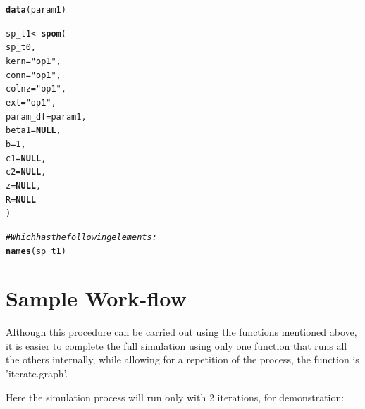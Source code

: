 \documentclass{article}\usepackage[]{graphicx}\usepackage[]{xcolor}
\makeatletter
\newcommand{\hlnum}[1]{\textcolor[rgb]{0.686,0.059,0.569}{#1}}%
\newcommand{\hlsng}[1]{\textcolor[rgb]{0.192,0.494,0.8}{#1}}%
\newcommand{\hlcom}[1]{\textcolor[rgb]{0.678,0.584,0.686}{\textit{#1}}}%
\newcommand{\hldef}[1]{\textcolor[rgb]{0.345,0.345,0.345}{#1}}%
\newcommand{\hlkwa}[1]{\textcolor[rgb]{0.161,0.373,0.58}{\textbf{#1}}}%
\newcommand{\hlkwb}[1]{\textcolor[rgb]{0.69,0.353,0.396}{#1}}%
\newcommand{\hlkwc}[1]{\textcolor[rgb]{0.333,0.667,0.333}{#1}}%
\newcommand{\hlkwd}[1]{\textcolor[rgb]{0.737,0.353,0.396}{\textbf{#1}}}%
\newenvironment{kframe}{%
 \def\at@end@of@kframe{}%
 \ifinner\ifhmode%
  \def\at@end@of@kframe{\end{minipage}}%
  \begin{minipage}{\columnwidth}%
 \fi\fi%
 \def\FrameCommand##1{\hskip\@totalleftmargin \hskip-\fboxsep
 \colorbox{shadecolor}{##1}\hskip-\fboxsep
     \hskip-\linewidth \hskip-\@totalleftmargin \hskip\columnwidth}%
 \MakeFramed {\advance\hsize-\width
   \@totalleftmargin\z@ \linewidth\hsize
   \@setminipage}}%
 {\par\unskip\endMakeFramed%
 \at@end@of@kframe}
\newenvironment{knitrout}{}{} %
\makeatother
\begin{document}
\begin{knitrout}
\color{fgcolor}\begin{kframe}
\begin{alltt}
\hlkwd{data}\hldef{(param1)}
\end{alltt}


{\ttfamily\noindent\color{warningcolor}{\#\# Warning in data(param1): data set 'param1' not found}}\begin{alltt}
\hldef{sp_t1} \hlkwb{<-} \hlkwd{spom}\hldef{(}
\hldef{sp_t0,}
\hlkwc{kern}\hldef{=}\hlsng{"op1"}\hldef{,}
\hlkwc{conn}\hldef{=}\hlsng{"op1"}\hldef{,}
\hlkwc{colnz}\hldef{=}\hlsng{"op1"}\hldef{,}
\hlkwc{ext}\hldef{=}\hlsng{"op1"}\hldef{,}
\hlkwc{param_df}\hldef{=param1,}
\hlkwc{beta1}\hldef{=}\hlkwa{NULL}\hldef{,}
\hlkwc{b}\hldef{=}\hlnum{1}\hldef{,}
\hlkwc{c1}\hldef{=}\hlkwa{NULL}\hldef{,}
\hlkwc{c2}\hldef{=}\hlkwa{NULL}\hldef{,}
\hlkwc{z}\hldef{=}\hlkwa{NULL}\hldef{,}
\hlkwc{R}\hldef{=}\hlkwa{NULL}
\hldef{)}
\end{alltt}


{\ttfamily\noindent\bfseries{}}\begin{alltt}
\hlcom{#Which has the following elements:}
\hlkwd{names}\hldef{(sp_t1)}
\end{alltt}


{\ttfamily\noindent\bfseries\color{errorcolor}{\#\# Error: object 'sp\_t1' not found}}\end{kframe}
\end{knitrout}


\section{Sample Work-flow}
Although this procedure can be carried out using the functions mentioned above, it is easier to complete the full simulation using only one function that runs all the others internally, while allowing for a repetition of the process, the function is 'iterate.graph'.

Here the simulation process will run only with 2 iterations, for demonstration:
\end{document}
